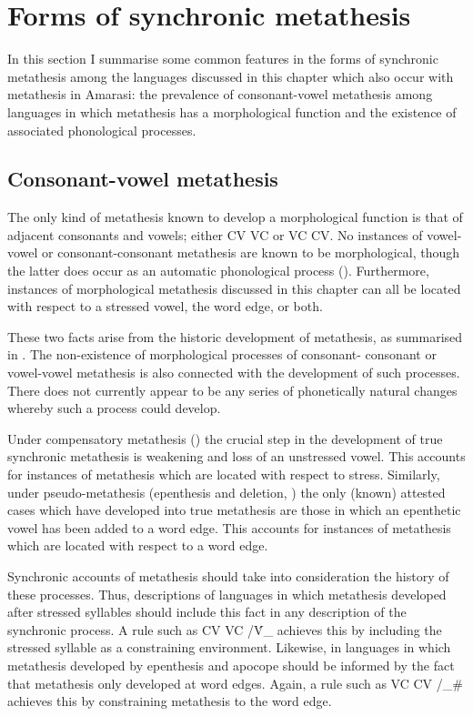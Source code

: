 \section{Forms of synchronic metathesis}\label{sec:For ch:SynchMet}
In this section I summarise some common features in the forms
of synchronic metathesis among the languages discussed in this chapter
which also occur with metathesis in Amarasi:
the prevalence of consonant-vowel metathesis among
languages in which metathesis has a morphological function
and the existence of associated phonological processes.

\subsection{Consonant-vowel metathesis}
The only kind of metathesis known to develop
a morphological function is that of adjacent consonants and vowels;
either CV {\ra} VC or VC {\ra} CV.
No instances of vowel-vowel or consonant-consonant
metathesis are known to be morphological,
though the latter does occur as an automatic
phonological process ().
Furthermore, instances of morphological metathesis
discussed in this chapter can all be located with respect
to a stressed vowel, the word edge, or both.

These two facts arise from the historic development
of metathesis, as summarised in .
The non-existence of morphological processes
of consonant- consonant or vowel-vowel metathesis
is also connected with the development of such processes.
There does not currently appear to be any series of
phonetically natural changes whereby such a process could develop.

Under compensatory metathesis () the crucial step in the development of
true synchronic metathesis is weakening and loss of an unstressed vowel.
This accounts for instances of metathesis which are located with respect to stress.
Similarly, under pseudo-metathesis (epenthesis and deletion, )
the only (known) attested cases which have developed into true metathesis
are those in which an epenthetic vowel has been added to a word edge.
This accounts for instances of metathesis which
are located with respect to a word edge.

Synchronic accounts of metathesis should take into
consideration the history of these processes.
Thus, descriptions of languages in which metathesis developed after stressed syllables
should include this fact in any description of the synchronic process.
A rule such as CV {\ra} VC /\'V{\_} achieves this by including
the stressed syllable as a constraining environment.
Likewise, in languages in which metathesis developed by epenthesis and apocope
should be informed by the fact that metathesis only developed at word edges.
Again, a rule such as VC {\ra} CV /{\_}{\#} achieves this 
by constraining metathesis to the word edge.

